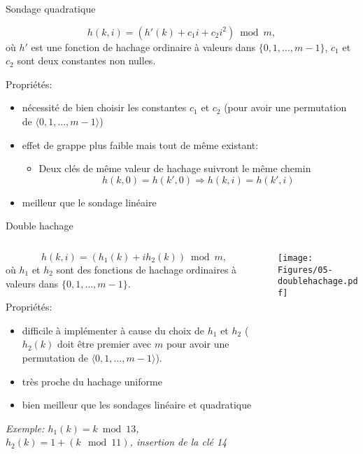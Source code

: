 \begin{frame}{Sondage quadratique}

$$h(k,i)=(h'(k)+c_1 i+ c_2 i^2) \bmod m,$$
où $h'$ est une fonction de hachage ordinaire à valeurs dans $\{0,1,\ldots,m-1\}$, $c_1$ et $c_2$ sont deux constantes non nulles.

\bigskip

Propriétés:
\begin{itemize}
\item nécessité de bien choisir les constantes $c_1$ et $c_2$ (pour
  avoir une permutation de $\langle 0,1,\ldots,m-1\rangle$)
\item effet de grappe plus faible mais tout de même existant:
\begin{itemize}
\item  Deux clés de même valeur de hachage suivront le même chemin
$$h(k,0)=h(k',0)\Rightarrow h(k,i)=h(k',i)$$
\end{itemize}
\item meilleur que le sondage linéaire
\end{itemize}


\end{frame}

\begin{frame}{Double hachage}

\begin{columns}
\begin{column}{9cm}

$$h(k,i)=(h_1(k)+i h_2(k))\bmod m,$$
où $h_1$ et $h_2$ sont des fonctions de hachage ordinaires à valeurs dans $\{0,1,\ldots,m-1\}$.

\bigskip

Propriétés:
\begin{itemize}
\item difficile à implémenter à cause du choix de $h_1$ et $h_2$ ($h_2(k)$ doit être premier avec $m$ pour avoir une permutation de $\langle 0,1,\ldots,m-1\rangle$).
\item très proche du hachage uniforme
\item bien meilleur que les sondages linéaire et quadratique
\end{itemize}

\bigskip

\emph{Exemple: $h_1(k)=k\bmod 13$, $h_2(k)=1+(k\mod 11)$, insertion de la clé 14}

\end{column}
\begin{column}{2.5cm}
\begin{center}
\texttt{[image: Figures/05-doublehachage.pdf]}
\end{center}
\end{column}
\end{columns}
\end{frame}

